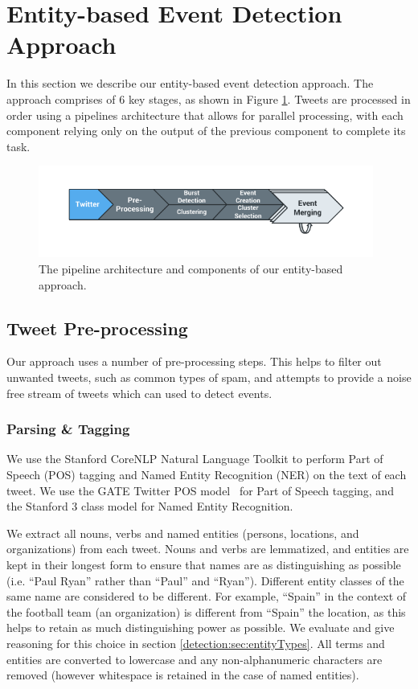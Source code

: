 
\section{Entity-based Event Detection Approach}
\label{detection:sec:approach}
In this section we describe our entity-based event detection approach. The approach comprises of 6 key stages, as shown in Figure \ref{detection:graphic:pipeline}. Tweets are processed in order using a pipelines architecture that allows for parallel processing, with each component relying only on the output of the previous component to complete its task.

\vspace{0.5cm}
\begin{figure}[h!]
	\centering
	\includegraphics[width=11cm,trim=1.5cm 1cm 1.5cm 0.8cm]{Chapters/EntityDetection/images/system.pdf}
	\caption{The pipeline architecture and components of our entity-based approach.}
	\label{detection:graphic:pipeline}
\end{figure}

\subsection{Tweet Pre-processing}
Our approach uses a number of pre-processing steps. This helps to filter out unwanted tweets, such as common types of spam, and attempts to provide a noise free stream of tweets which can used to detect events.

\subsubsection{Parsing \& Tagging}
\label{detection:sec:parsing}
We use the Stanford CoreNLP Natural Language Toolkit to perform Part of Speech (POS) tagging and Named Entity Recognition (NER) on the text of each tweet.
We  use the GATE Twitter POS model~\citep{TwitterPOS} for Part of Speech tagging, and the Stanford 3 class model for Named Entity Recognition.

We extract all nouns, verbs and named entities (persons, locations, and organizations) from each tweet.
Nouns and verbs are lemmatized, and entities are kept in their longest form to ensure that names are as distinguishing as possible  (i.e. ``Paul Ryan'' rather than ``Paul'' and ``Ryan'').
Different entity classes of the same name are considered to be different.
For example, ``Spain'' in the context of the football team (an organization) is different from ``Spain'' the location, as this helps to retain as much distinguishing power as possible.
We evaluate and give reasoning for this choice in section \ref{detection:sec:entityTypes}.
All terms and entities are converted to lowercase and any non-alphanumeric characters are removed (however whitespace is retained in the case of named entities).

